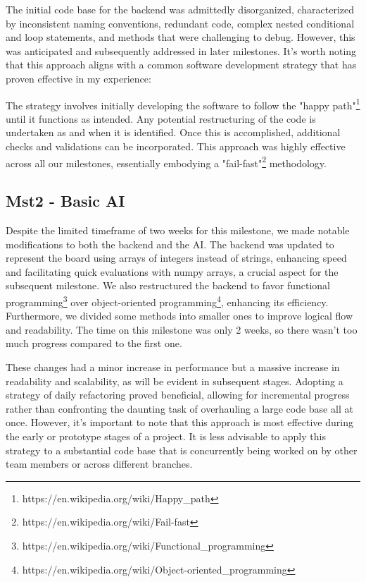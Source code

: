 The initial code base for the backend was admittedly disorganized, characterized by inconsistent naming conventions, redundant code, complex nested conditional and loop statements, and methods that were challenging to debug. However, this was anticipated and subsequently addressed in later milestones. It's worth noting that this approach aligns with a common software development strategy that has proven effective in my experience:

The strategy involves initially developing the software to follow the "happy path"\footnote{https://en.wikipedia.org/wiki/Happy\_path} until it functions as intended. Any potential restructuring of the code is undertaken as and when it is identified. Once this is accomplished, additional checks and validations can be incorporated. This approach was highly effective across all our milestones, essentially embodying a "fail-fast"\footnote{https://en.wikipedia.org/wiki/Fail-fast} methodology.

\subsection{Mst2 - Basic AI}

Despite the limited timeframe of two weeks for this milestone, we made notable modifications to both the backend and the AI. The backend was updated to represent the board using arrays of integers instead of strings, enhancing speed and facilitating quick evaluations with numpy arrays, a crucial aspect for the subsequent milestone. We also restructured the backend to favor functional programming\footnote{https://en.wikipedia.org/wiki/Functional\_programming} over object-oriented programming\footnote{https://en.wikipedia.org/wiki/Object-oriented\_programming}, enhancing its efficiency. Furthermore, we divided some methods into smaller ones to improve logical flow and readability.
The time on this milestone was only 2 weeks, so there wasn't too much
progress compared to the first one.

These changes had a minor increase in performance but a massive
increase in readability and scalability, as will be evident in subsequent stages. 
Adopting a strategy of daily refactoring proved beneficial, allowing for incremental progress rather than confronting the daunting task of overhauling a large code base all at once. However, it's important to note that this approach is most effective during the early or prototype stages of a project. It is less advisable to apply this strategy to a substantial code base that is concurrently being worked on by other team members or across different branches.

